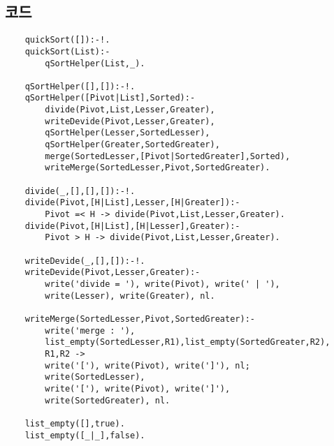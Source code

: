 \documentclass{article}
\begin{document}
\subsection{코드}
\begin{lstlisting}
	quickSort([]):-!.
	quickSort(List):-
		qSortHelper(List,_).
	
	qSortHelper([],[]):-!.
	qSortHelper([Pivot|List],Sorted):-
		divide(Pivot,List,Lesser,Greater),
		writeDevide(Pivot,Lesser,Greater),
		qSortHelper(Lesser,SortedLesser),
		qSortHelper(Greater,SortedGreater),
		merge(SortedLesser,[Pivot|SortedGreater],Sorted),
		writeMerge(SortedLesser,Pivot,SortedGreater).
	
	divide(_,[],[],[]):-!.
	divide(Pivot,[H|List],Lesser,[H|Greater]):-
		Pivot =< H -> divide(Pivot,List,Lesser,Greater).
	divide(Pivot,[H|List],[H|Lesser],Greater):-
		Pivot > H -> divide(Pivot,List,Lesser,Greater).
	
	writeDevide(_,[],[]):-!.
	writeDevide(Pivot,Lesser,Greater):-
		write('divide = '), write(Pivot), write(' | '),
		write(Lesser), write(Greater), nl.
	
	writeMerge(SortedLesser,Pivot,SortedGreater):-
		write('merge : '),
		list_empty(SortedLesser,R1),list_empty(SortedGreater,R2),
		R1,R2 ->
		write('['), write(Pivot), write(']'), nl;
		write(SortedLesser),
		write('['), write(Pivot), write(']'),
		write(SortedGreater), nl.
	
	list_empty([],true).
	list_empty([_|_],false).	
\end{lstlisting}
\end{document}
